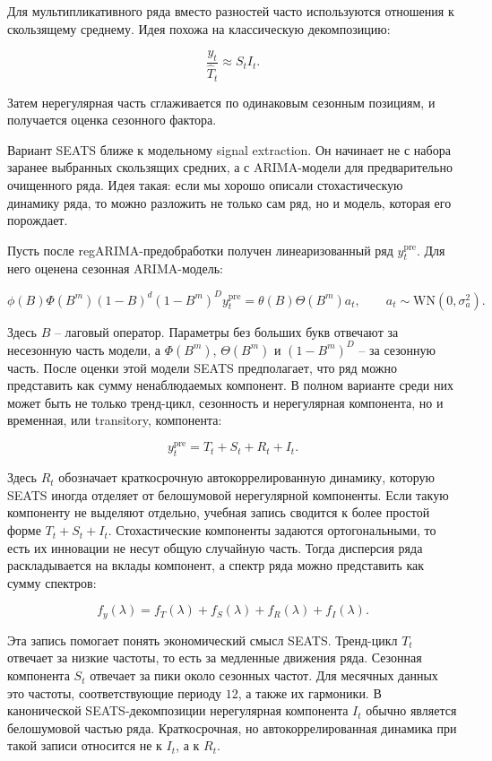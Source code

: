 \documentclass[12pt,fleqn]{article}
\begin{document}
Для мультипликативного ряда вместо разностей часто используются отношения к скользящему среднему.
Идея похожа на классическую декомпозицию:

\[
\frac{y_t}{\hat T_t}
\approx
S_t I_t.
\]

Затем нерегулярная часть сглаживается по одинаковым сезонным позициям, и получается оценка сезонного фактора.

Вариант SEATS ближе к модельному signal extraction.
Он начинает не с набора заранее выбранных скользящих средних, а с ARIMA-модели для предварительно очищенного ряда.
Идея такая: если мы хорошо описали стохастическую динамику ряда, то можно разложить не только сам ряд, но и модель, которая его порождает.

Пусть после regARIMA-предобработки получен линеаризованный ряд \(y_t^{\mathrm{pre}}\).
Для него оценена сезонная ARIMA-модель:

\[
\phi(B)\Phi(B^m)
(1-B)^d(1-B^m)^D
y_t^{\mathrm{pre}}
=
\theta(B)\Theta(B^m)a_t,
\qquad
a_t\sim \mathrm{WN}(0,\sigma_a^2).
\]

Здесь \(B\) -- лаговый оператор.
Параметры без больших букв отвечают за несезонную часть модели, а \(\Phi(B^m)\), \(\Theta(B^m)\) и \((1-B^m)^D\) -- за сезонную часть.
После оценки этой модели SEATS предполагает, что ряд можно представить как сумму ненаблюдаемых компонент.
В полном варианте среди них может быть не только тренд-цикл, сезонность и нерегулярная компонента, но и временная, или transitory, компонента:

\[
y_t^{\mathrm{pre}}
=
T_t
+S_t
+R_t
+I_t.
\]

Здесь \(R_t\) обозначает краткосрочную автокоррелированную динамику, которую SEATS иногда отделяет от белошумовой нерегулярной компоненты.
Если такую компоненту не выделяют отдельно, учебная запись сводится к более простой форме \(T_t+S_t+I_t\).
Стохастические компоненты задаются ортогональными, то есть их инновации не несут общую случайную часть.
Тогда дисперсия ряда раскладывается на вклады компонент, а спектр ряда можно представить как сумму спектров:

\[
f_y(\lambda)
=
f_T(\lambda)
+f_S(\lambda)
+f_R(\lambda)
+f_I(\lambda).
\]

Эта запись помогает понять экономический смысл SEATS.
Тренд-цикл \(T_t\) отвечает за низкие частоты, то есть за медленные движения ряда.
Сезонная компонента \(S_t\) отвечает за пики около сезонных частот.
Для месячных данных это частоты, соответствующие периоду \(12\), а также их гармоники.
В канонической SEATS-декомпозиции нерегулярная компонента \(I_t\) обычно является белошумовой частью ряда.
Краткосрочная, но автокоррелированная динамика при такой записи относится не к \(I_t\), а к \(R_t\).
\end{document}
